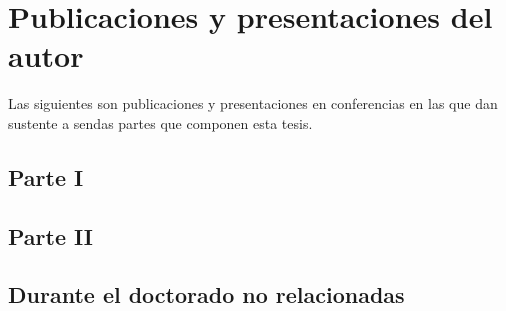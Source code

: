 \documentclass[a4paper,twoside,openright]{book}
\begin{document}
\newpage
\thispagestyle{empty}

\tableofcontents

\chapter{Publicaciones y presentaciones del autor}
Las siguientes son publicaciones y presentaciones en conferencias en las que dan sustente a sendas partes que componen esta tesis.

\section*{Parte I}
\cite{caldarola_fuente_2009}
\cite{caldarola_fuente_2010-1}
\cite{rieznik_pcf-based_2010}
\cite{rieznik_optimum_2012}
\cite{caldarola_high-speed_2012}


\section*{Parte II} 
\cite{ortega_point--point_2011}
\cite{ortega_altas_2010}
\cite{ortega_cdma_2012}
\cite{ortega_hamming-weight_2012}
\cite{alvarez-hamelin_device_2013} %
\cite{ortega_encrypted_2014}


\section*{Durante el doctorado no relacionadas} 
\cite{pasquini_memory_2007}
\cite{beget_sailhflood:_2013}
\end{document}
